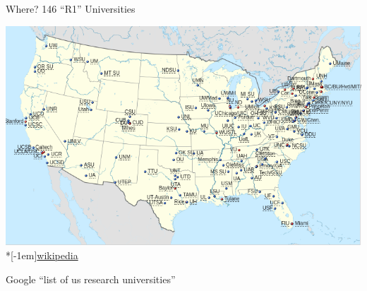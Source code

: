 \begin{frame}[fragile]{Where? 146 ``R1'' Universities}
\begin{center}
\includegraphics[width=\textwidth]{r1map-wiki}\\*[-1em]\hfill{\tiny \href{https://en.wikipedia.org/wiki/List_of_research_universities_in_the_United_States}{wikipedia}}

Google ``list of us research universities''


\end{center}
\end{frame}

